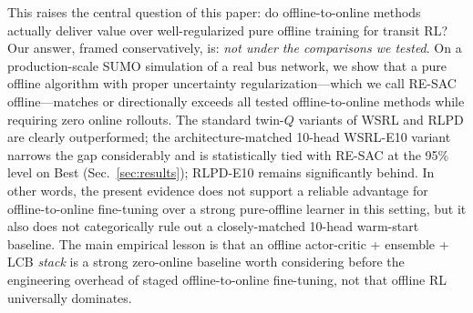 \documentclass[journal,10pt]{IEEEtran}
\begin{document}
This raises the central question of this paper: do offline-to-online methods actually deliver value over well-regularized pure offline training for transit RL? Our answer, framed conservatively, is: \emph{not under the comparisons we tested}. On a production-scale SUMO simulation of a real bus network, we show that a pure offline algorithm with proper uncertainty regularization---which we call RE-SAC offline---matches or directionally exceeds all tested offline-to-online methods while requiring zero online rollouts. The standard twin-$Q$ variants of WSRL and RLPD are clearly outperformed; the architecture-matched 10-head WSRL-E10 variant narrows the gap considerably and is statistically tied with RE-SAC at the 95\% level on Best (Sec.~\ref{sec:results}); RLPD-E10 remains significantly behind. In other words, the present evidence does not support a reliable advantage for offline-to-online fine-tuning over a strong pure-offline learner in this setting, but it also does not categorically rule out a closely-matched 10-head warm-start baseline. The main empirical lesson is that an offline actor-critic + ensemble + LCB \emph{stack} is a strong zero-online baseline worth considering before the engineering overhead of staged offline-to-online fine-tuning, not that offline RL universally dominates.
\end{document}
